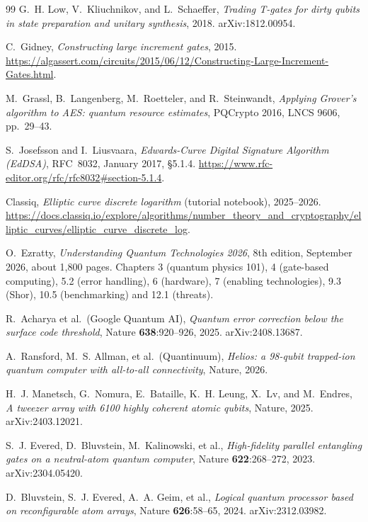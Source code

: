 \documentclass[11pt]{article}
\theoremstyle{plain}
\theoremstyle{remark}
\begin{document}
\begin{thebibliography}{99}
G.~H. Low, V.~Kliuchnikov, and L.~Schaeffer,
\emph{Trading T-gates for dirty qubits in state preparation and unitary synthesis}, 2018.
arXiv:1812.00954.

C.~Gidney,
\emph{Constructing large increment gates}, 2015.
\url{https://algassert.com/circuits/2015/06/12/Constructing-Large-Increment-Gates.html}.

M.~Grassl, B.~Langenberg, M.~Roetteler, and R.~Steinwandt,
\emph{Applying Grover's algorithm to AES: quantum resource estimates},
PQCrypto 2016, LNCS 9606, pp.~29--43.

S.~Josefsson and I.~Liusvaara,
\emph{Edwards-Curve Digital Signature Algorithm (EdDSA)},
RFC~8032, January 2017, \S5.1.4.
\url{https://www.rfc-editor.org/rfc/rfc8032#section-5.1.4}.

Classiq,
\emph{Elliptic curve discrete logarithm} (tutorial notebook), 2025--2026.
\url{https://docs.classiq.io/explore/algorithms/number_theory_and_cryptography/elliptic_curves/elliptic_curve_discrete_log}.

O.~Ezratty,
\emph{Understanding Quantum Technologies 2026}, 8th edition, September 2026, about 1,800 pages.
Chapters 3 (quantum physics 101), 4 (gate-based computing), 5.2 (error handling), 6 (hardware),
7 (enabling technologies), 9.3 (Shor), 10.5 (benchmarking) and 12.1 (threats).

R.~Acharya et al.\ (Google Quantum AI),
\emph{Quantum error correction below the surface code threshold},
Nature \textbf{638}:920--926, 2025. arXiv:2408.13687.

A.~Ransford, M.~S. Allman, et al.\ (Quantinuum),
\emph{Helios: a 98-qubit trapped-ion quantum computer with all-to-all connectivity},
Nature, 2026.

H.~J. Manetsch, G.~Nomura, E.~Bataille, K.~H. Leung, X.~Lv, and M.~Endres,
\emph{A tweezer array with 6100 highly coherent atomic qubits},
Nature, 2025. arXiv:2403.12021.

S.~J. Evered, D.~Bluvstein, M.~Kalinowski, et al.,
\emph{High-fidelity parallel entangling gates on a neutral-atom quantum computer},
Nature \textbf{622}:268--272, 2023. arXiv:2304.05420.

D.~Bluvstein, S.~J. Evered, A.~A. Geim, et al.,
\emph{Logical quantum processor based on reconfigurable atom arrays},
Nature \textbf{626}:58--65, 2024. arXiv:2312.03982.


\end{thebibliography}
\end{document}
